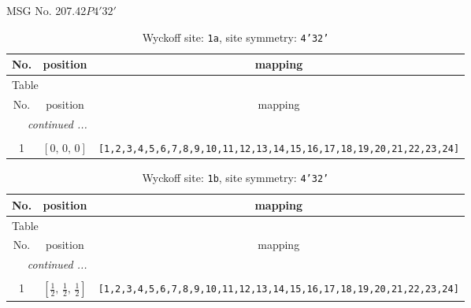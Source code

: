 \documentclass[fleqn,8pt]{jsarticle}
\begin{document}
\setcounter{MaxMatrixCols}{32}

\renewcommand{\tablename}{Table~}
\renewcommand{\figurename}{Figure~}
\begin{center}
\LARGE
MSG No. 207.42\quad$P4'32'$
\end{center}
\renewcommand{\arraystretch}{1.2}
\begin{longtable}{ccc}
\caption{Wyckoff site: {\tt 1a}, site symmetry: {\tt 4'32'}}
 \\
 \hline \hline
No. & position & mapping \\ \hline \endfirsthead

\multicolumn{2}{l}{\tablename\ \thetable{}} \\
 \hline \hline
No. & position & mapping \\ \hline \endhead

 \hline \hline
\multicolumn{2}{r}{\footnotesize\it continued ...} \\ \endfoot

 \hline \hline
\multicolumn{2}{r}{} \\ \endlastfoot

1 & $\left[ 0,\, 0,\, 0 \right]$ & {\tt [1,2,3,4,5,6,7,8,9,10,11,12,13,14,15,16,17,18,19,20,21,22,23,24]} \\
\end{longtable}
\renewcommand{\arraystretch}{1.2}
\begin{longtable}{ccc}
\caption{Wyckoff site: {\tt 1b}, site symmetry: {\tt 4'32'}}
 \\
 \hline \hline
No. & position & mapping \\ \hline \endfirsthead

\multicolumn{2}{l}{\tablename\ \thetable{}} \\
 \hline \hline
No. & position & mapping \\ \hline \endhead

 \hline \hline
\multicolumn{2}{r}{\footnotesize\it continued ...} \\ \endfoot

 \hline \hline
\multicolumn{2}{r}{} \\ \endlastfoot

1 & $\left[ \frac{1}{2},\, \frac{1}{2},\, \frac{1}{2} \right]$ & {\tt [1,2,3,4,5,6,7,8,9,10,11,12,13,14,15,16,17,18,19,20,21,22,23,24]} \\
\end{longtable}
\renewcommand{\arraystretch}{1.2}
\end{document}
